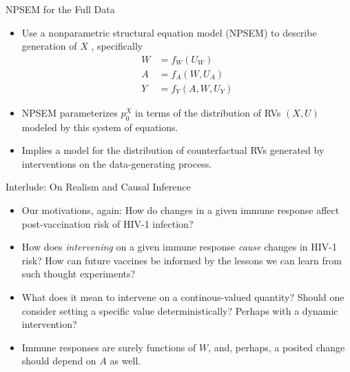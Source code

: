 \documentclass{beamer}
\begin{document}

\begin{frame}[c]{NPSEM for the Full Data}

\begin{center}
\begin{itemize}
  \itemsep10pt
  \item Use a nonparametric structural equation model (NPSEM) to describe
    generation of $X$ \citep{pearl2009causality}, specifically
    \begin{align*}
      W &= f_W(U_W) \\ A &= f_A(W, U_A) \\ Y &= f_Y(A, W, U_Y)
    \end{align*}
  \item NPSEM parameterizes $p_0^X$ in terms of the distribution of RVs $(X, U)$
    modeled by this system of equations.
  \item Implies a model for the distribution of counterfactual RVs generated by
    interventions on the data-generating process.
\end{itemize}
\end{center}


\end{frame}


\begin{frame}[c]{Interlude: On Realism and Causal Inference}

\begin{center}
\begin{itemize}
  \itemsep6pt
  \item Our motivations, again: How do changes in a given immune response affect
    post-vaccination risk of HIV-1 infection?
  \item How does \textit{intervening} on a given immune response \textit{cause}
    changes in HIV-1 risk? How can future vaccines be informed by the lessons
    we can learn from such thought experiments?
  \item What does it mean to intervene on a continous-valued quantity? Should
    one consider setting a specific value deterministically? Perhaps with a
    dynamic intervention?
  \item Immune responses are surely functions of $W$, and, perhaps, a posited
    change should depend on $A$ as well.
\end{itemize}
\end{center}


\end{frame}
\end{document}

